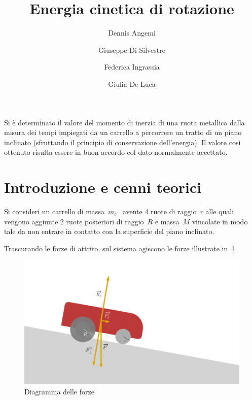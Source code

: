 \documentclass[10pt,a4paper]{article}
\renewenvironment{abstract}
  {{\bfseries\noindent{\abstractname}\par\nobreak}\footnotesize}
  {\bigskip}
\begin{document}
\title{Energia cinetica di rotazione}



\author[1]{Dennis Angemi}%
\author[1]{Giuseppe Di Silvestre}%
\author[1]{Federica Ingrassia}%
\author[1]{Giulia De Luca}%
%


\vspace{-1em}



  \date{}


\begingroup
\let\center\flushleft
\let\endcenter\endflushleft
\maketitle
\endgroup





\begin{abstract}
Si è determinato il valore del momento di inerzia di una ruota metallica
dalla misura dei tempi impiegati da un carrello a percorrere un tratto
di un piano inclinato (sfruttando il principio di conservazione
dell'energia). Il valore così ottenuto risulta essere in buon accordo
col dato normalmente accettato.%
\end{abstract}%



\sloppy


\section*{\texorpdfstring{{Introduzione e cenni
teorici}}{Introduzione e cenni teorici}}

{\label{876971}}

Si consideri un carrello di massa~\(m_c\)~ avente 4 ruote di
raggio~\(r\) alle quali vengono aggiunte 2 ruote posteriori
di raggio~\(R\) e massa~\(M\) vincolate in
modo tale da non entrare in contatto con la superficie del piano
inclinato.

Trascurando le forze di attrito, sul sistema agiscono le forze
illustrate in~{\ref{240030}}
\begin{figure}[H]
\begin{center}
\includegraphics[width=0.70\columnwidth]{figures/diagramma/diagramma}
\caption{{Diagramma delle forze
{\label{240030}}%
}}
\end{center}
\end{figure}
\end{document}
